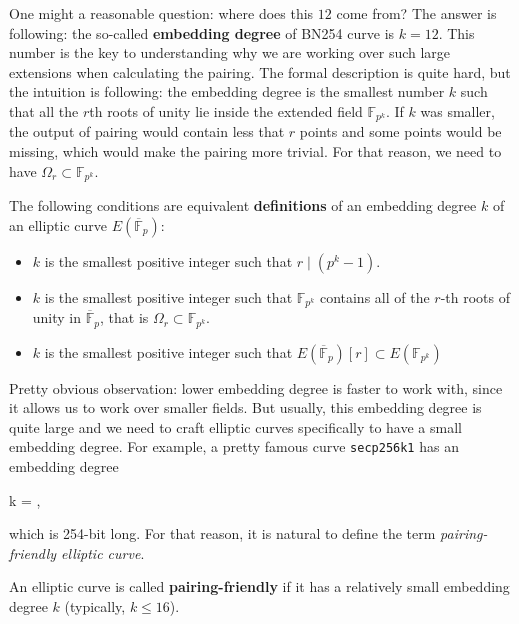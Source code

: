 \documentclass[../lecture-notes-148x210.tex]{subfiles}
\begin{document}
\begin{remark}
    One might a reasonable question: where does this $12$ come from? The answer is following: the so-called \textbf{embedding degree} of BN254 curve is $k=12$. This number is the key to understanding why we are working over such large extensions when calculating the pairing. The formal description is quite hard, but the intuition is following: the embedding degree is the smallest number $k$ such that all the $r$th roots of unity lie inside the extended field $\mathbb{F}_{p^k}$. If $k$ was smaller, the output of pairing would contain less that $r$ points and some points would be missing, which would make the pairing more trivial. For that reason, we need to have $\Omega_r \subset \mathbb{F}_{p^k}$.
\end{remark}

\begin{definition}
    The following conditions are equivalent \textbf{definitions} of an embedding degree $k$ of an elliptic curve $E(\overline{\mathbb{F}}_p)$:
    \begin{itemize}
        \item $k$ is the smallest positive integer such that $r \mid (p^k-1)$.
        \item $k$ is the smallest positive integer such that $\mathbb{F}_{p^k}$ contains all of the $r$-th roots of unity in $\overline{\mathbb{F}}_p$, that is $\Omega_r \subset \mathbb{F}_{p^k}$.
        \item $k$ is the smallest positive integer such that $E(\overline{\mathbb{F}}_p)[r] \subset E(\mathbb{F}_{p^k})$
    \end{itemize}
\end{definition}

Pretty obvious observation: lower embedding degree is faster to work with, since it allows us to work over smaller fields. But usually, this embedding degree is quite large and we need to craft elliptic curves specifically to have a small embedding degree. For example, a pretty famous curve \texttt{secp256k1} has an embedding degree
\begin{xequation*}
    k = ,
\end{xequation*}
which is 254-bit long. For that reason, it is natural to define the term \textit{pairing-friendly elliptic curve}.
\begin{definition}
    An elliptic curve is called \textbf{pairing-friendly} if it has a relatively small embedding degree $k$ (typically, $k \leq 16$).
\end{definition}
\end{document}
